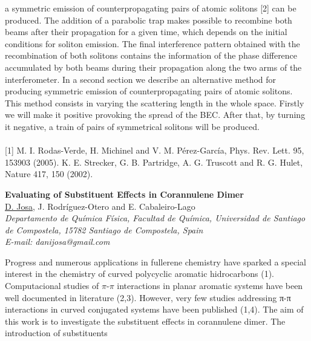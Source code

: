 a symmetric emission of counterpropagating pairs of atomic solitons [2] can be produced. The addition
of a parabolic trap makes possible to recombine both beams after their propagation for a given
time, which depends on the initial conditions for soliton emission. The final interference pattern
obtained with the recombination of both solitons contains the information of the phase difference
accumulated by both beams during their propagation along the two arms of the interferometer.
In a second section we describe an alternative method for producing symmetric emission of
counterpropagating pairs of atomic solitons. This method consists in varying the scattering length in
the whole space. Firstly we will make it positive provoking the spread of the BEC. After that, by
turning it negative, a train of pairs of symmetrical solitons will be produced.
\\
\vspace{0.5cm}
\\
{\footnotesize
[1] M. I. Rodas-Verde, H. Michinel and V. M. Pérez-García, Phys. Rev. Lett. 95, 153903 (2005).
\newline
[2] K. E. Strecker, G. B. Partridge, A. G. Truscott and R. G. Hulet, Nature 417, 150 (2002).
}
\newpage
\setcounter{figure}{0}
\begin{center}
{\bf \Large
Evaluating of Substituent Effects in Corannulene Dimer
}
\\
\vspace{0.5cm}
\underline{D. Josa}, J. Rodríguez-Otero and E. Cabaleiro-Lago
\\
\vspace{0.5cm}
{\it
 Departamento de Química Física, Facultad de Química, Universidad de Santiago de Compostela, 15782
                                      Santiago de Compostela, Spain
}
\\
\vspace{0.5cm}
{\it E-mail: danijosa@gmail.com }
\\
\vspace{0.5cm}
\end{center}
          Progress and numerous applications in fullerene chemistry have sparked a
special interest in the chemistry of curved polycyclic aromatic hidrocarbons (1).
Computacional studies of $\pi$-$\pi$ interactions in planar aromatic systems have been well
documented in literature (2,3). However, very few studies addressing π-π interactions in
curved conjugated systems have been published (1,4). The aim of this work is to
investigate the substituent effects in corannulene dimer. The introduction of substituents
